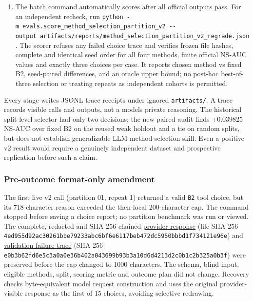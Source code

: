 \documentclass[
  10pt,
]{ctexart}
\begin{document}
\begin{enumerate}
  existing outcome directories and will not run without the frozen
  choices. The underlying per-case wrapper commands remain documented in
  the script for manual audit.
\item
  The batch command automatically scores after all official outputs
  pass. For an independent recheck, run
  \texttt{python\ -m\ evals.\allowbreak{}score\_\allowbreak{}method\_\allowbreak{}selection\_\allowbreak{}partition\_\allowbreak{}v2\ -\/\allowbreak{}-output\ artifacts/\allowbreak{}reports/\allowbreak{}method\_\allowbreak{}selection\_\allowbreak{}partition\_\allowbreak{}v2\_\allowbreak{}regrade.\allowbreak{}json}.
  The scorer refuses any failed choice trace and verifies frozen file
  hashes, complete and identical seed order for all four methods, finite
  official NS-AUC values and exactly three choices per case. It reports
  chosen method vs fixed B2, seed-paired differences, and an oracle
  upper bound; no post-hoc best-of-three selection or treating repeats
  as independent cohorts is permitted.
\end{enumerate}

Every stage writes JSONL trace receipts under ignored
\texttt{artifacts/\allowbreak{}}. A trace records visible calls and outputs, not a
model\textquotesingle s private reasoning. The historical split-level
selector had only two decisions; the new paired audit finds +0.039825
NS-AUC over fixed B2 on the reused weak holdout and a tie on random
splits, but does not establish generalizable LLM method-selection skill.
Even a positive v2 result would require a genuinely independent dataset
and prospective replication before such a claim.

\subsubsection{Pre-outcome format-only
amendment}\label{pre-outcome-format-only-amendment}

The first live v2 call (partition 01, repeat 1) returned a valid
\texttt{B2} tool choice, but its 718-character reason exceeded the
then-local 200-character cap. The command stopped before saving a choice
report; no partition benchmark was run or viewed. The complete, redacted
and SHA-256-chained
\href{../benchmark/results/traces/method_selection_v2_initial_provider_attempt.jsonl}{provider
response} (file SHA-256
\texttt{4ed955d92ac302\allowbreak{}61bbe79233abc6\allowbreak{}bf6e6117beb472\allowbreak{}dc5950bbbd1f73\allowbreak{}4121e96e})
and
\href{../benchmark/results/traces/method_selection_v2_initial_validation_failure.jsonl}{validation-failure
trace} (SHA-256
\texttt{e0b3b62fd6e5c3\allowbreak{}a0a0e36b402a04\allowbreak{}3699b93b3a10d6\allowbreak{}d4213d2c0b1c2b\allowbreak{}325a0b3f})
were preserved before the cap changed to 1000 characters. The schema,
blind input, eligible methods, split, scoring metric and outcome plan
did not change. Recovery checks byte-equivalent model request
construction and uses the original provider-visible response as the
first of 15 choices, avoiding selective redrawing.
\end{document}
